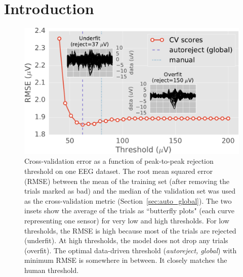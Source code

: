 \noindent{}%

\clearpage
\section{Introduction}
\label{sec:introduction}

\begin{figure}[t]
	\centering
	\includegraphics[width=0.65\linewidth]{figures/figure1.pdf}
    \caption[Cross-validation error as a function of peak-to-peak rejection threshold on one EEG dataset.]{Cross-validation error as a function of peak-to-peak rejection threshold on one EEG dataset. The root mean squared error (RMSE) between the mean of the training set (after removing the trials marked as bad) and the median of the validation set was used as the cross-validation metric (Section~\ref{sec:auto_global}). The two insets show the average of the trials as ``butterfly plots" (each curve representing one sensor) for very low and high thresholds. For low thresholds, the RMSE is high because most of the trials are rejected (underfit). At high thresholds, the model does not drop any trials (overfit). The optimal data-driven threshold (\emph{autoreject, global}) with minimum RMSE is somewhere in between. It closely matches the human threshold.}
    \label{fig:cross_val}
\end{figure}

